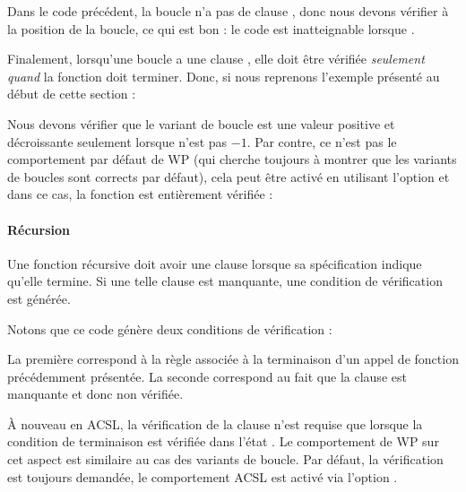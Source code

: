 

Dans le code précédent, la boucle n'a pas de clause ,
donc nous devons vérifier  à
la position de la boucle, ce qui est bon : le code est inatteignable lorsque
.


Finalement, lorsqu'une boucle a une clause , elle doit
être vérifiée \textit{seulement quand} la fonction doit terminer. Donc, si nous
reprenons l'exemple présenté au début de cette section :




Nous devons vérifier que le variant de boucle est une valeur positive et
décroissante seulement lorsque  n'est pas $-1$. Par
contre, ce n'est pas le comportement par défaut de WP (qui cherche toujours à
montrer que les variants de boucles sont corrects par défaut), cela peut être
activé en utilisant l'option  et dans
ce cas, la fonction est entièrement vérifiée :




\paragraph{Récursion}


Une fonction récursive doit avoir une clause  lorsque sa
spécification indique qu'elle termine. Si une telle clause est manquante, une
condition de vérification  est générée.




Notons que ce code génère deux conditions de vérification :




La première correspond à la règle associée à la terminaison d'un appel de
fonction précédemment présentée. La seconde correspond au fait que la clause
 est manquante et donc non vérifiée.


À nouveau en ACSL, la vérification de la clause  n'est
requise que lorsque la condition de terminaison est vérifiée dans l'état
. Le comportement de WP sur cet aspect est similaire au cas
des variants de boucle. Par défaut, la vérification est toujours demandée, le
comportement ACSL est activé via l'option
.


